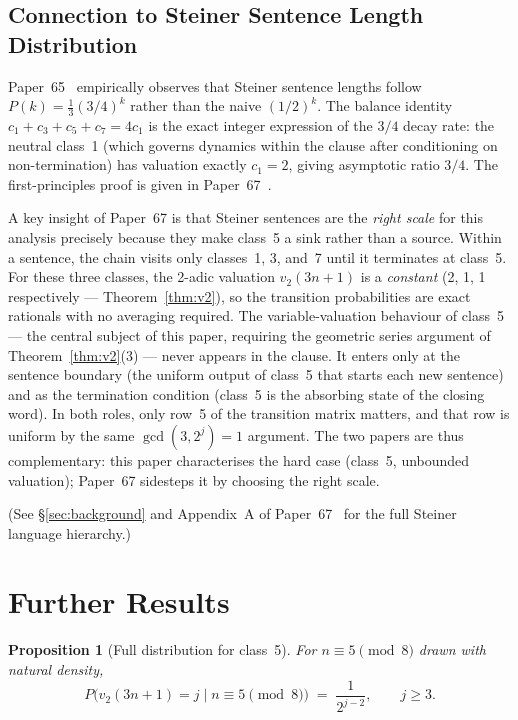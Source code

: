 \documentclass[12pt]{article}
\newtheorem{proposition}[theorem]{Proposition}
\theoremstyle{definition}
\theoremstyle{remark}
\newcommand{\vt}{v_2}
\begin{document}
\subsection{Connection to Steiner Sentence Length Distribution}

Paper~65~\cite{paper65} empirically observes that Steiner sentence lengths
follow $P(k) = \frac{1}{3}(3/4)^k$ rather than the naive $(1/2)^k$.
The balance identity $c_1 + c_3 + c_5 + c_7 = 4 c_1$ is the exact integer
expression of the $3/4$ decay rate: the neutral class~1 (which governs
dynamics within the clause after conditioning on non-termination) has valuation
exactly $c_1 = 2$, giving asymptotic ratio $3/4$. The first-principles proof
is given in Paper~67~\cite{paper67}.

A key insight of Paper~67 is that Steiner sentences are the \emph{right scale}
for this analysis precisely because they make class~5 a sink rather than a source.
Within a sentence, the chain visits only classes~1, 3, and~7 until it terminates
at class~5. For these three classes, the 2-adic valuation $\vt(3n+1)$ is a
\emph{constant} (2, 1, 1 respectively — Theorem~\ref{thm:v2}), so the transition
probabilities are exact rationals with no averaging required.
The variable-valuation behaviour of class~5 — the central subject of this paper,
requiring the geometric series argument of Theorem~\ref{thm:v2}(3) — never appears
in the clause. It enters only at the sentence boundary (the
uniform output of class~5 that starts each new sentence) and as the termination
condition (class~5 is the absorbing state of the closing word). In both roles, only
row~5 of the transition matrix matters, and that row is uniform by the same
$\gcd(3,2^j)=1$ argument.
The two papers are thus complementary: this paper characterises the hard case
(class~5, unbounded valuation); Paper~67 sidesteps it by choosing the right scale.

(See §\ref{sec:background} and Appendix~A of Paper~67~\cite{paper67} for the
full Steiner language hierarchy.)

\section{Further Results}
\label{sec:open}

\begin{proposition}[Full distribution for class~5]
\label{prop:class5dist}
For $n \equiv 5 \pmod{8}$ drawn with natural density,
\[
  P\!\bigl(\vt(3n+1) = j \;\big|\; n \equiv 5 \pmod{8}\bigr)
  \;=\; \frac{1}{2^{j-2}}, \qquad j \geq 3.
\]
\end{proposition}
\end{document}

